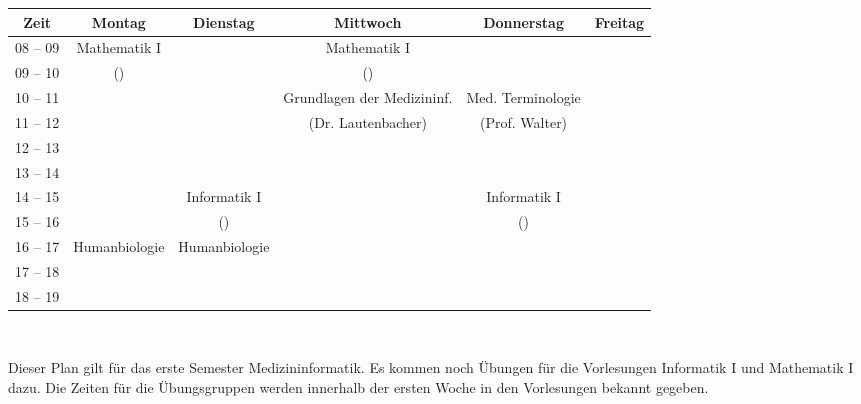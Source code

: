\begin{minipage}{\textwidth}
    \footnotesize
\begin{center}
\begin{tabular}{|c|c|c|c|c|c|}
	\hline
	Zeit    & Montag       	& Dienstag    	& Mittwoch                  	& Donnerstag		& Freitag   \\\hline\hline
	08 – 09 & Mathematik I 	&             	& Mathematik I              	&			&			\\\cline{1-1}\cline{3-3}\cline{5-6}
	09 – 10 & (\Matheprof) 	&             	& (\Matheprof)              	&   			&			\\\hline
	10 – 11 &              	&             	& Grundlagen der Medizininf.	& Med. Terminologie&			\\\cline{1-3}\cline{5-6}
	11 – 12 &              	&             	& (Dr. Lautenbacher)						       	& (Prof. Walter)&			\\\hline
	12 – 13 &              	&             	&                           	&			&			\\\hline
	13 – 14 &              	&             	&                           	&			&			\\\hline
	14 – 15 &              	& Informatik I	&                           	& Informatik I		&			\\\cline{1-2}\cline{4-4}\cline{6-6}
	15 – 16 &              	& (\Infoprof) 	&                           	& (\Infoprof)		&			\\\hline
	16 – 17 & Humanbiologie	& Humanbiologie &                           	&			&			\\\cline{1-1}\cline{4-6}
	17 – 18 &              	&             	&                           	& 			&			\\\cline{1-4}\cline{6-6}
 	18 – 19 &              	&             	&                           	& 			&			\\\hline
\end{tabular}
    ~\\
\end{center}
\end{minipage}

Dieser Plan gilt für das erste Semester Medizininformatik. Es kommen noch Übungen für die Vorlesungen
Informatik I und Mathematik I dazu. Die Zeiten für die Übungsgruppen werden innerhalb der ersten Woche in den Vorlesungen bekannt gegeben. \\ \\
